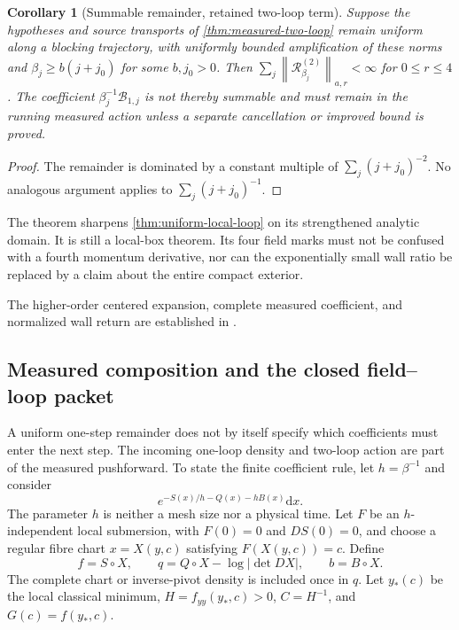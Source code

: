 \documentclass[11pt,oneside,openany]{book}
\newtheorem{corollary}[corollary]{Corollary}
\theoremstyle{definition}
\theoremstyle{remark}
\newcommand{\dd}{\mathrm d}
\newcommand{\norm}[1]{\left\lVert#1\right\rVert}
\newcommand{\src}[2]{\cite[#2]{#1}}
\newcommand{\sourcebasis}[1]{\par\smallskip\noindent #1\par}
\begin{document}
\begin{corollary}[Summable remainder, retained two-loop term]
\label{cor:two-loop-summability}
Suppose the hypotheses and source transports of
\cref{thm:measured-two-loop} remain uniform along a blocking trajectory,
with uniformly bounded amplification of these norms and
$\beta_j\ge b(j+j_0)$ for some $b,j_0>0$. Then
$\sum_j\norm{\mathcal R_{\beta_j}^{(2)}}_{a,r}<\infty$ for $0\le r\le4$.
The coefficient $\beta_j^{-1}\mathcal B_{1,j}$ is not thereby summable
and must remain in the running measured action unless a separate
cancellation or improved bound is proved.
\end{corollary}
\begin{proof}
The remainder is dominated by a constant multiple of
$\sum_j(j+j_0)^{-2}$. No analogous argument applies to
$\sum_j(j+j_0)^{-1}$.
\end{proof}
The theorem sharpens \cref{thm:uniform-local-loop} on its strengthened
analytic domain. It is still a local-box theorem. Its four field marks
must not be confused with a fourth momentum derivative, nor can the
exponentially small wall ratio be replaced by a claim about the entire
compact exterior.
\sourcebasis{The higher-order centered expansion, complete measured
coefficient, and normalized wall return are established in
\src{SM}{V7--V8}.}


\subsection{Measured composition and the closed field--loop packet}
\label{sec:measured-loop-composition}
A uniform one-step remainder does not by itself specify which
coefficients must enter the next step. The incoming one-loop density
and two-loop action are part of the measured pushforward. To state the
finite coefficient rule, let $h=\beta^{-1}$ and consider
\[
 e^{-S(x)/h-Q(x)-hB(x)}\dd x.
\]
The parameter $h$ is neither a mesh size nor a physical time. Let
$F$ be an $h$-independent local submersion, with $F(0)=0$ and
$DS(0)=0$, and choose a regular fibre chart $x=X(y,c)$ satisfying
$F(X(y,c))=c$. Define
\[
 f=S\circ X,\qquad q=Q\circ X-\log|\det DX|,\qquad b=B\circ X.
\]
The complete chart or inverse-pivot density is included once in $q$.
Let $y_*(c)$ be the local classical minimum, $H=f_{yy}(y_*,c)>0$,
$C=H^{-1}$, and $G(c)=f(y_*,c)$.
\end{document}
